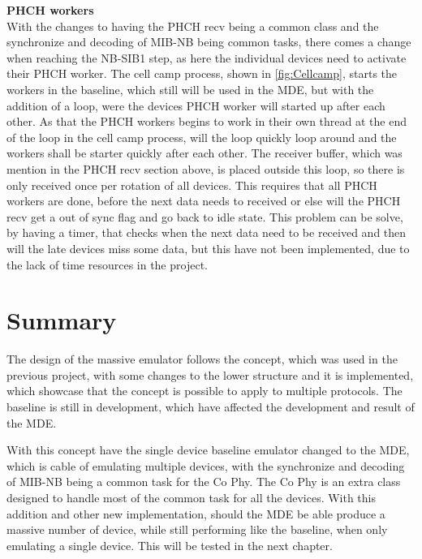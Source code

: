 \textbf{PHCH workers}\\
With the changes to having the PHCH recv being a common class and the synchronize and decoding of MIB-NB being common tasks, there comes a change when reaching the NB-SIB1 step, as here the individual devices need to activate their PHCH worker. The cell camp process, shown in \autoref{fig:Cellcamp}, starts the workers in the baseline, which still will be used in the MDE, but with the addition of a loop, were the devices PHCH worker will started up after each other. As that the PHCH workers begins to work in their own thread at the end of the loop in the cell camp process, will the loop quickly loop around and the workers shall be starter quickly after each other. The receiver buffer, which was mention in the PHCH recv section above, is placed outside this loop, so there is only received once per rotation of all devices. This requires that all PHCH workers are done, before the next data needs to received or else will the PHCH recv get a out of sync flag and go back to idle state. This problem can be solve, by having a timer, that checks when the next data need to be received and then will the late devices miss some data, but this have not been implemented, due to the lack of time resources in the project.

\section{Summary}
The design of the massive emulator follows the concept, which  was used in the previous project, with some changes to the lower structure and it is implemented, which showcase that the concept is possible to apply to multiple protocols. The baseline is still in development, which have affected the development and result of the MDE. 

With this concept have the single device baseline emulator changed to the MDE, which is cable of emulating multiple devices, with the synchronize and decoding of MIB-NB being a common task for the Co Phy. The Co Phy is an extra class designed to handle most of the common task for all the devices. With this addition and other new implementation, should the MDE be able produce a massive number of device, while still performing like the baseline, when only emulating a single device. This will be tested in the next chapter.


